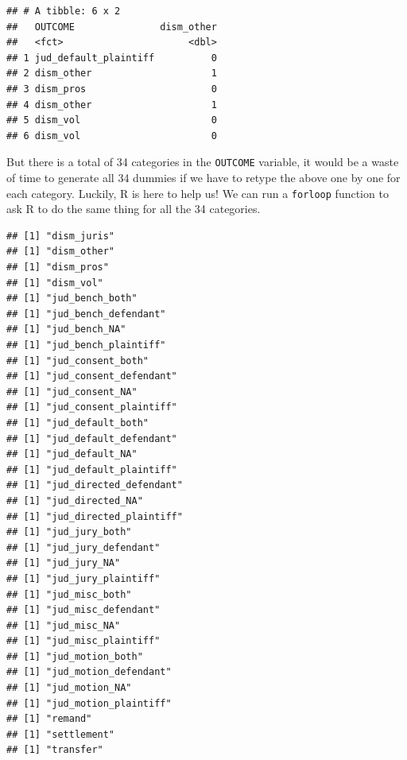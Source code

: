 \documentclass[
]{article}
\newenvironment{Shaded}{\begin{snugshade}}{\end{snugshade}}
\newcommand{\ControlFlowTok}[1]{\textcolor[rgb]{0.13,0.29,0.53}{\textbf{#1}}}
\newcommand{\DecValTok}[1]{\textcolor[rgb]{0.00,0.00,0.81}{#1}}
\newcommand{\DocumentationTok}[1]{\textcolor[rgb]{0.56,0.35,0.01}{\textbf{\textit{#1}}}}
\newcommand{\FunctionTok}[1]{\textcolor[rgb]{0.00,0.00,0.00}{#1}}
\newcommand{\NormalTok}[1]{#1}
\newcommand{\OtherTok}[1]{\textcolor[rgb]{0.56,0.35,0.01}{#1}}
\newcommand{\SpecialCharTok}[1]{\textcolor[rgb]{0.00,0.00,0.00}{#1}}
\begin{document}
\begin{verbatim}
## # A tibble: 6 x 2
##   OUTCOME               dism_other
##   <fct>                      <dbl>
## 1 jud_default_plaintiff          0
## 2 dism_other                     1
## 3 dism_pros                      0
## 4 dism_other                     1
## 5 dism_vol                       0
## 6 dism_vol                       0
\end{verbatim}

But there is a total of 34 categories in the \texttt{OUTCOME} variable,
it would be a waste of time to generate all 34 dummies if we have to
retype the above one by one for each category. Luckily, R is here to
help us! We can run a \texttt{forloop} function to ask R to do the same
thing for all the 34 categories.

\begin{Shaded}
\end{Shaded}

\begin{verbatim}
## [1] "dism_juris"
## [1] "dism_other"
## [1] "dism_pros"
## [1] "dism_vol"
## [1] "jud_bench_both"
## [1] "jud_bench_defendant"
## [1] "jud_bench_NA"
## [1] "jud_bench_plaintiff"
## [1] "jud_consent_both"
## [1] "jud_consent_defendant"
## [1] "jud_consent_NA"
## [1] "jud_consent_plaintiff"
## [1] "jud_default_both"
## [1] "jud_default_defendant"
## [1] "jud_default_NA"
## [1] "jud_default_plaintiff"
## [1] "jud_directed_defendant"
## [1] "jud_directed_NA"
## [1] "jud_directed_plaintiff"
## [1] "jud_jury_both"
## [1] "jud_jury_defendant"
## [1] "jud_jury_NA"
## [1] "jud_jury_plaintiff"
## [1] "jud_misc_both"
## [1] "jud_misc_defendant"
## [1] "jud_misc_NA"
## [1] "jud_misc_plaintiff"
## [1] "jud_motion_both"
## [1] "jud_motion_defendant"
## [1] "jud_motion_NA"
## [1] "jud_motion_plaintiff"
## [1] "remand"
## [1] "settlement"
## [1] "transfer"
\end{verbatim}
\end{document}
